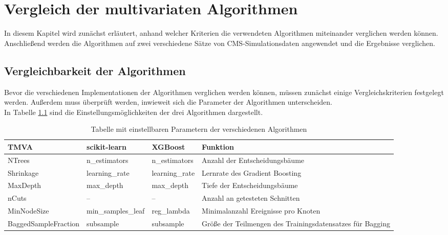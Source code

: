 \chapter{Vergleich der multivariaten Algorithmen}
\label{ch:vergleich}

{}

In diesem Kapitel wird zun\"achst erl\"autert, anhand welcher Kriterien die verwendeten Algorithmen miteinander verglichen werden k\"onnen. Anschlie\ss end werden die Algorithmen auf zwei verschiedene S\"atze von CMS-Simulationsdaten angewendet und die Ergebnisse verglichen.

\section{Vergleichbarkeit der Algorithmen}
\label{ch:Vergleich:sec:Vergleichbarkeit}

Bevor die verschiedenen Implementationen der Algorithmen verglichen werden k\"onnen, m\"ussen zun\"achst einige Vergleichskriterien festgelegt werden. Au\ss erdem muss \"uberpr\"uft werden, inwieweit sich die Parameter der Algorithmen unterscheiden.\\
In Tabelle \ref{tab:parameter} sind die Einstellungsm\"oglichkeiten der drei Algorithmen dargestellt.

\begin{table}[tbp]\parbox{12cm}{
  \caption[Algorithmenparameter]{Tabelle mit einstellbaren Parametern der verschiedenen Algorithmen}%
  }\label{tab:parameter}
  \begin{center}
  \begin{tabular}{p{3.75cm}p{2.75cm}p{2.25cm}p{4.5cm}}
  \hline
  {\bf TMVA} & {\bf scikit-learn} & {\bf XGBoost} & {\bf Funktion} \\
  \hline \hline
     NTrees	& n\_estimators & n\_estimators & Anzahl der Entscheidungsb\"aume \\
     Shrinkage	& learning\_rate & learning\_rate & Lernrate des Gradient Boosting \\
     MaxDepth & max\_depth & max\_depth & Tiefe der Entscheidungsb\"aume\\
     nCuts & -- & -- & Anzahl an getesteten Schnitten\\ 
  	 MinNodeSize & min\_samples\_leaf & reg\_lambda & Minimalanzahl Ereignisse pro Knoten\\ 
  	 BaggedSampleFraction & subsample & subsample & Gr\"o\ss e der Teilmengen des Trainingsdatensatzes f\"ur Bagging\\                     
  \hline
  \end{tabular}
  \end{center}
\end{table}

